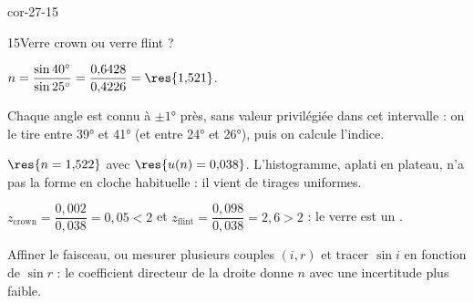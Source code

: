 \begin{blocLivre}{cor-27-15}
\begin{corrige}{15}{Verre crown ou verre flint ?}
\begin{questions}
\item $n=\dfrac{\sin\ang{40}}{\sin\ang{25}}=\dfrac{0{,}6428}{0{,}4226}=\res{1{,}521}$.
\item Chaque angle est connu à $\pm\ang{1}$ près, sans valeur privilégiée dans cet intervalle : on le tire
 entre \ang{39} et \ang{41} (et entre \ang{24} et \ang{26}), puis on calcule l'indice.
\item $\res{n=1{,}522}$ avec $\res{u(n)=0{,}038}$. L'histogramme, aplati en plateau, n'a pas la forme en cloche habituelle :
il vient de tirages uniformes.
\item $z_\text{crown}=\dfrac{0{,}002}{0{,}038}=0{,}05<2$ et $z_\text{flint}=\dfrac{0{,}098}{0{,}038}=2{,}6>2$ : le verre est un .
\item Affiner le faisceau, ou mesurer plusieurs couples $(i,r)$ et tracer $\sin i$ en fonction de $\sin r$ : le coefficient
directeur de la droite donne $n$ avec une incertitude plus faible.
\end{questions}
\end{corrige}
\end{blocLivre}
